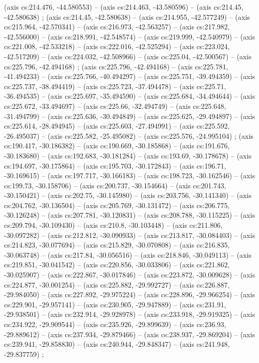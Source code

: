     (axis cs:214.476,    -44.580553) --  (axis cs:214.463,    -43.580596) --  (axis cs:214.45,    -42.580638) ;
    (axis cs:214.45,    -42.580638) --  (axis cs:214.955,    -42.577249) --  (axis cs:215.964,    -42.570341) --  (axis cs:216.973,    -42.563257) --  (axis cs:217.982,    -42.556000) --  (axis cs:218.991,    -42.548574) --  (axis cs:219.999,    -42.540979) --  (axis cs:221.008,    -42.533218) --  (axis cs:222.016,    -42.525294) --  (axis cs:223.024,    -42.517209) --  (axis cs:224.032,    -42.508966) --  (axis cs:225.04,    -42.500567) --  (axis cs:225.796,    -42.494168) ;
    (axis cs:225.796,    -42.494168) --  (axis cs:225.781,    -41.494233) --  (axis cs:225.766,    -40.494297) --  (axis cs:225.751,    -39.494359) --  (axis cs:225.737,    -38.494419) --  (axis cs:225.723,    -37.494478) --  (axis cs:225.71,    -36.494535) --  (axis cs:225.697,    -35.494590) --  (axis cs:225.684,    -34.494644) --  (axis cs:225.672,    -33.494697) --  (axis cs:225.66,    -32.494749) --  (axis cs:225.648,    -31.494799) --  (axis cs:225.636,    -30.494849) --  (axis cs:225.625,    -29.494897) --  (axis cs:225.614,    -28.494945) --  (axis cs:225.603,    -27.494991) --  (axis cs:225.592,    -26.495037) --  (axis cs:225.582,    -25.495082) --  (axis cs:225.576,    -24.995104) ;
    (axis cs:190.417,    -30.186382) --  (axis cs:190.669,    -30.185868) --  (axis cs:191.676,    -30.183680) --  (axis cs:192.683,    -30.181284) --  (axis cs:193.69,    -30.178678) --  (axis cs:194.697,    -30.175864) --  (axis cs:195.703,    -30.172843) --  (axis cs:196.71,    -30.169615) --  (axis cs:197.717,    -30.166183) --  (axis cs:198.723,    -30.162546) --  (axis cs:199.73,    -30.158706) --  (axis cs:200.737,    -30.154664) --  (axis cs:201.743,    -30.150421) --  (axis cs:202.75,    -30.145980) --  (axis cs:203.756,    -30.141340) --  (axis cs:204.762,    -30.136504) --  (axis cs:205.769,    -30.131472) --  (axis cs:206.775,    -30.126248) --  (axis cs:207.781,    -30.120831) --  (axis cs:208.788,    -30.115225) --  (axis cs:209.794,    -30.109430) --  (axis cs:210.8,    -30.103448) --  (axis cs:211.806,    -30.097282) --  (axis cs:212.812,    -30.090933) --  (axis cs:213.817,    -30.084403) --  (axis cs:214.823,    -30.077694) --  (axis cs:215.829,    -30.070808) --  (axis cs:216.835,    -30.063748) --  (axis cs:217.84,    -30.056516) --  (axis cs:218.846,    -30.049113) --  (axis cs:219.851,    -30.041542) --  (axis cs:220.856,    -30.033806) --  (axis cs:221.862,    -30.025907) --  (axis cs:222.867,    -30.017846) --  (axis cs:223.872,    -30.009628) --  (axis cs:224.877,    -30.001254) --  (axis cs:225.882,    -29.992727) --  (axis cs:226.887,    -29.984050) --  (axis cs:227.892,    -29.975224) --  (axis cs:228.896,    -29.966254) --  (axis cs:229.901,    -29.957141) --  (axis cs:230.905,    -29.947889) --  (axis cs:231.91,    -29.938501) --  (axis cs:232.914,    -29.928978) --  (axis cs:233.918,    -29.919325) --  (axis cs:234.922,    -29.909544) --  (axis cs:235.926,    -29.899639) --  (axis cs:236.93,    -29.889612) --  (axis cs:237.934,    -29.879466) --  (axis cs:238.937,    -29.869204) --  (axis cs:239.941,    -29.858830) --  (axis cs:240.944,    -29.848347) --  (axis cs:241.948,    -29.837759) ;
